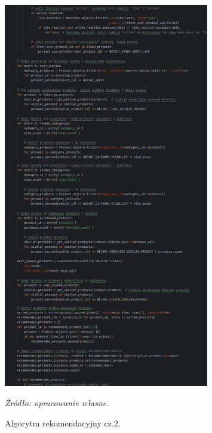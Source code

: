 \documentclass[12pt,a4paper,oneside]{article}
\theoremstyle{definition}
\numberwithin{equation}{section}
\begin{document}
\begin{figure}[H]
    \centering
    \includegraphics[width=0.8\textwidth]{images/krzysztofBImages/recommended_algorithm_2.png}
    \caption{Algorytm rekomendacyjny cz.2.}
    \emph{Źródło: opracowanie własne.}
    \label{fig:recommendation_step2}
\end{figure}
\end{document}
